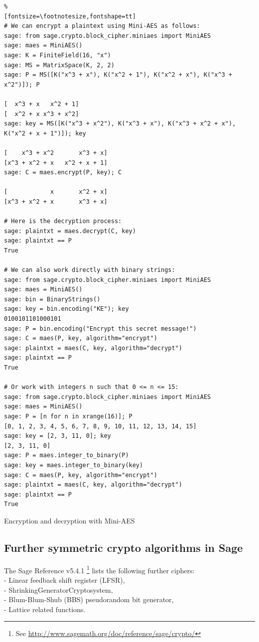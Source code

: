 \begin{sagecode}
\begin{Verbatim}%
[fontsize=\footnotesize,fontshape=tt]
# We can encrypt a plaintext using Mini-AES as follows:
sage: from sage.crypto.block_cipher.miniaes import MiniAES
sage: maes = MiniAES()
sage: K = FiniteField(16, "x")
sage: MS = MatrixSpace(K, 2, 2)
sage: P = MS([K("x^3 + x"), K("x^2 + 1"), K("x^2 + x"), K("x^3 + x^2")]); P

[  x^3 + x   x^2 + 1]
[  x^2 + x x^3 + x^2]
sage: key = MS([K("x^3 + x^2"), K("x^3 + x"), K("x^3 + x^2 + x"), K("x^2 + x + 1")]); key

[    x^3 + x^2       x^3 + x]
[x^3 + x^2 + x   x^2 + x + 1]
sage: C = maes.encrypt(P, key); C

[            x       x^2 + x]
[x^3 + x^2 + x       x^3 + x]

# Here is the decryption process:
sage: plaintxt = maes.decrypt(C, key)
sage: plaintxt == P
True

# We can also work directly with binary strings:
sage: from sage.crypto.block_cipher.miniaes import MiniAES
sage: maes = MiniAES()
sage: bin = BinaryStrings()
sage: key = bin.encoding("KE"); key
0100101101000101
sage: P = bin.encoding("Encrypt this secret message!")
sage: C = maes(P, key, algorithm="encrypt")
sage: plaintxt = maes(C, key, algorithm="decrypt")
sage: plaintxt == P
True

# Or work with integers n such that 0 <= n <= 15:
sage: from sage.crypto.block_cipher.miniaes import MiniAES
sage: maes = MiniAES()
sage: P = [n for n in xrange(16)]; P
[0, 1, 2, 3, 4, 5, 6, 7, 8, 9, 10, 11, 12, 13, 14, 15]
sage: key = [2, 3, 11, 0]; key
[2, 3, 11, 0]
sage: P = maes.integer_to_binary(P)
sage: key = maes.integer_to_binary(key)
sage: C = maes(P, key, algorithm="encrypt")
sage: plaintxt = maes(C, key, algorithm="decrypt")
sage: plaintxt == P
True
\end{Verbatim}
\caption{Encryption and decryption with Mini-AES}
\label{cryptomethods:Mini-AES:Sage_example}
\end{sagecode}



\subsection{Further symmetric crypto algorithms in Sage}
\label{CM_Sage_SymCryptoAlg}

The Sage Reference v5.4.1%
\footnote{
See \url{http://www.sagemath.org/doc/reference/sage/crypto/}
}
lists the following further ciphers:\\ 
- Linear feedback shift register (LFSR),\\
- ShrinkingGeneratorCryptosystem,\\
- Blum-Blum-Shub (BBS) pseudorandom bit generator,\\
- Lattice related functions.




